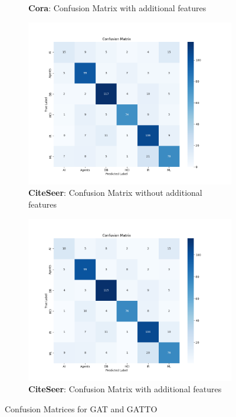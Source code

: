\documentclass[12pt,conference]{ieeeconf} %
\begin{document}
\begin{figure}[h!]
\begin{subfigure}[t]{.4\textwidth}
      \caption{\textbf{Cora}: Confusion Matrix with additional features}
    \end{subfigure}
  
    \medskip
  
    \begin{subfigure}[t]{.4\textwidth}
      \centering
      \includegraphics[width=\linewidth]{img/CiteSeer_CM_GAT.png}
      \caption{\textbf{CiteSeer}: Confusion Matrix without additional features}
    \end{subfigure}
    \hfill
    \begin{subfigure}[t]{.4\textwidth}
      \centering
      \includegraphics[width=\linewidth]{img/CiteSeer_CM_GATTO.png}
      \caption{\textbf{CiteSeer}: Confusion Matrix with additional features}
    \end{subfigure}
    \caption{Confusion Matrices for GAT and GATTO}
    \label{fig:Confusion_Matrices}
  \end{figure}
\end{document}
